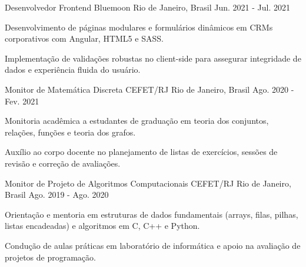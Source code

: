 \begin{cventries}

  \cventry
    {Desenvolvedor Frontend} %
    {Bluemoon} %
    {Rio de Janeiro, Brasil} %
    {Jun. 2021 - Jul. 2021} %
    {
      \begin{cvitems} %
        \item {Desenvolvimento de páginas modulares e formulários dinâmicos em CRMs corporativos com Angular, HTML5 e SASS.}
        \item {Implementação de validações robustas no client-side para assegurar integridade de dados e experiência fluida do usuário.}
      \end{cvitems}
    }

  \cventry
    {Monitor de Matemática Discreta} %
    {CEFET/RJ} %
    {Rio de Janeiro, Brasil} %
    {Ago. 2020 - Fev. 2021} %
    {
      \begin{cvitems} %
        \item {Monitoria acadêmica a estudantes de graduação em teoria dos conjuntos, relações, funções e teoria dos grafos.}
        \item {Auxílio ao corpo docente no planejamento de listas de exercícios, sessões de revisão e correção de avaliações.}
      \end{cvitems}
    }

  \cventry
    {Monitor de Projeto de Algoritmos Computacionais} %
    {CEFET/RJ} %
    {Rio de Janeiro, Brasil} %
    {Ago. 2019 - Ago. 2020} %
    {
      \begin{cvitems} %
        \item {Orientação e mentoria em estruturas de dados fundamentais (arrays, filas, pilhas, listas encadeadas) e algoritmos em C, C++ e Python.}
        \item {Condução de aulas práticas em laboratório de informática e apoio na avaliação de projetos de programação.}
      \end{cvitems}
    }

\end{cventries}
